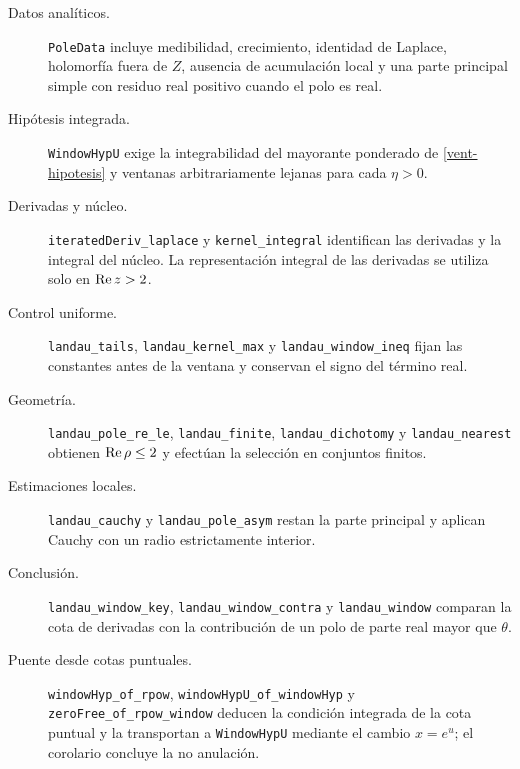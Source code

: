 \begingroup
\raggedright
\begin{description}
 \item[Datos analíticos.]
 \texttt{PoleData} incluye medibilidad, crecimiento, identidad de Laplace,
 holomorfía fuera de $Z$, ausencia de acumulación local y una parte
 principal simple con residuo real positivo cuando el polo es real.

 \item[Hipótesis integrada.]
 \texttt{WindowHypU} exige la integrabilidad del mayorante ponderado de
 \eqref{vent-hipotesis} y ventanas arbitrariamente lejanas para cada
 $\eta>0$.

 \item[Derivadas y núcleo.]
 \texttt{iteratedDeriv\_laplace} y \texttt{kernel\_integral} identifican
 las derivadas y la integral del núcleo. La representación integral
 de las derivadas se utiliza solo en $\operatorname{Re} z>2$.

 \item[Control uniforme.]
 \texttt{landau\_tails}, \texttt{landau\_kernel\_max} y
 \texttt{landau\_window\_ineq} fijan las constantes antes de la ventana
 y conservan el signo del término real.

 \item[Geometría.]
 \texttt{landau\_pole\_re\_le}, \texttt{landau\_finite},
 \texttt{landau\_dichotomy} y \texttt{landau\_nearest} obtienen
 $\operatorname{Re}\rho\le2$ y efectúan la selección en conjuntos finitos.

 \item[Estimaciones locales.]
 \texttt{landau\_cauchy} y \texttt{landau\_pole\_asym} restan la parte
 principal y aplican Cauchy con un radio estrictamente interior.

 \item[Conclusión.]
 \texttt{landau\_window\_key}, \texttt{landau\_window\_contra} y
 \texttt{landau\_window} comparan la cota de derivadas con la contribución
 de un polo de parte real mayor que $\theta$.

 \item[Puente desde cotas puntuales.]
 \texttt{windowHyp\_of\_rpow}, \texttt{windowHypU\_of\_windowHyp}
 y \texttt{zeroFree\_of\_rpow\_window}
 deducen la condición integrada de la cota puntual y la transportan
 a \texttt{WindowHypU} mediante el cambio $x=e^u$; el corolario
 concluye la no anulación.
\end{description}
\par
\endgroup

